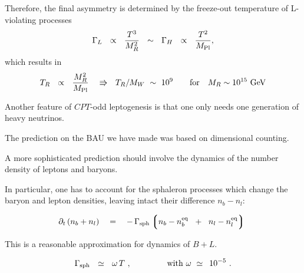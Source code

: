 \documentclass[pdf,UofT06talk,slideColor,colorBG,accumulate]{prosper}
\newcommand{\p}{\partial}
\newcommand{\eq}{{\rm eq}}
\newcommand{\lgr}{\left\lgroup}
\newcommand{\rgr}{\right\rgroup}
\newcommand{\GeV}{{\rm GeV}}
\newcommand{\Mpl}{M_{\rm Pl}}
\newcommand{\Gsph}{\Gamma_{\rm sph}}
\begin{document}
\begin{slide}{}
	Therefore, the final asymmetry is determined by the freeze-out
	temperature of L-violating processes
\[
	\Gamma_L ~~\propto~~ \frac{T^3}{M_R^2} 
	~~\sim~~ \Gamma_H ~~\propto~~ \frac{T^2}{\Mpl},
\]
	which results in
\[
	T_R ~~\propto~~ \frac{M_R^2}{\Mpl}~
	~~\Rrightarrow~~
	T_R/M_W ~\sim~ 10^9 \qquad \text{for}\quad M_R \sim 10^{15}~\GeV
\]

	Another feature of $ CPT $-odd leptogenesis is that one only
	needs {\mybf one generation} of heavy neutrinos.

\end{slide}

\begin{slide}{}

	The prediction on the BAU we have made was based on dimensional
	counting.

\vspace{0.2cm}
	A more sophisticated prediction should involve the dynamics of
	the number density of leptons and baryons.

\vspace{0.2cm}
	In particular, one has to account for the sphaleron processes
	which change the baryon and lepton densities, leaving intact
	their difference $ n_b - n_l $:

\[
		\p_t\, (n_b + n_l)
	~~~=~~~ -\, \Gsph 
		\lgr   n_b - n_b^\eq \;~+~\;
		       n_l - n_l^\eq 
		\rgr~
\]

	This is a reasonable approximation for dynamics of  $ B + L $.

\[
	\Gsph ~~\simeq~~ \omega\, T~, \qquad\qquad 
	{\rm ~with~}
	\omega ~\simeq~ \,10^{-5}~.
\]

\end{slide}
\end{document}
